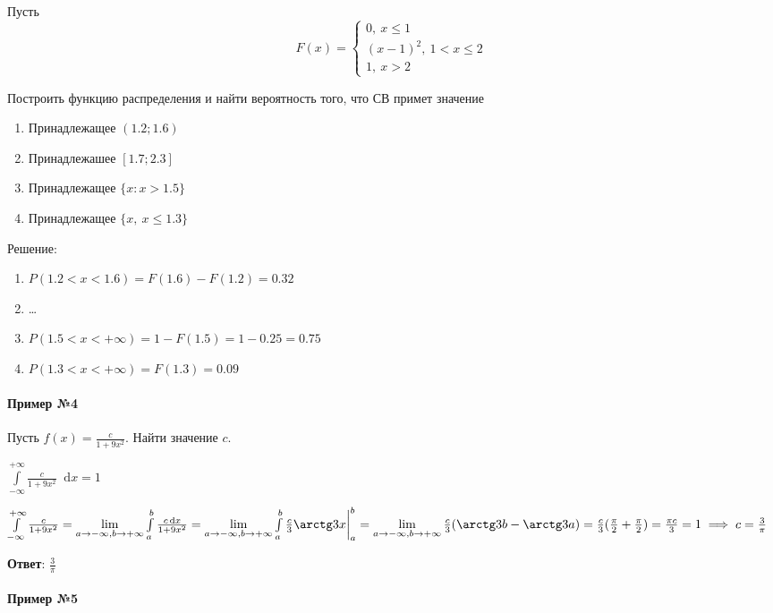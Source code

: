 \documentclass{article}
\newcommand*\diff{\mathop{}\!\mathrm{d}}
\begin{document}
Пусть $$F(x) = \begin{cases}
    0, \ x \le 1 \\
    (x - 1)^2, \ 1 < x \le 2 \\
    1, \ x > 2
\end{cases}
$$

Построить функцию распределения и найти вероятность того, что СВ примет значение

\begin{multicols}{2}
    \begin{enumerate}
        \item Принадлежащее $(1.2; 1.6)$
        \item Принадлежашее $[1.7; 2.3]$
        \item Принадлежащее $\{ x: x > 1.5 \}$
        \item Принадлежащее $\{ x, \ x \le 1.3 \}$
    \end{enumerate}    
\end{multicols}

Решение:

\begin{enumerate}
    \item $P(1.2 < x < 1.6) = F(1.6) - F(1.2) = 0.32$
    \item \dots
    \item $P(1.5 < x < +\infty) = 1 - F(1.5) = 1 - 0.25 = 0.75$
    \item $P(1.3 < x < +\infty) = F(1.3) = 0.09$
\end{enumerate}

\paragraph{Пример №4}

Пусть $f(x) = \frac{c}{1 + 9x^2}$. Найти значение $c$.

$\int\limits_{-\infty}^{+\infty} \frac{c}{1 + 9x^2} \diff x = 1$

$\int\limits_{-\infty}^{+\infty} \frac{c}{1 + 9x^2} = \lim\limits_{a \to -\infty, b \to +\infty} \int\limits_{a}^{b} \frac{c \diff x}{1 + 9x^2} = \lim\limits_{a \to -\infty, b \to +\infty} \int\limits_{a}^{b} \frac{c}{3} \arctg 3x \bigg|_{a}^{b} = \lim\limits_{a \to -\infty, b \to +\infty} \frac{c}{3} (\arctg 3b - \arctg 3a) = \frac{c}{3} (\frac{\pi}{2} + \frac{\pi}{2}) = \frac{\pi c}{3} = 1 \implies c = \frac{3}{\pi}$

\textbf{Ответ}: $\frac{3}{\pi}$

\paragraph{Пример №5}
\end{document}
